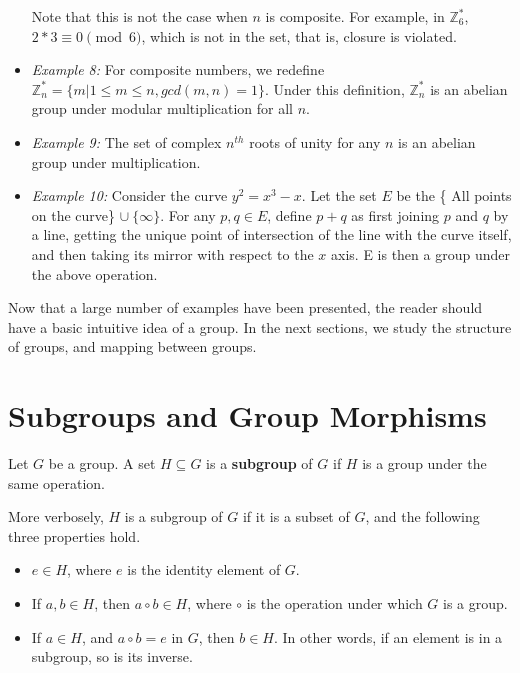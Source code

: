 \begin{itemize}
    Note that this is not the case when $n$ is composite. 
    For example, in $\mathbb{Z}_{6}^{*}$, $2 * 3 \equiv 0 \pmod{6}$, which is not in the set, that is, closure is violated.
  \item \emph{Example 8:} For composite numbers, we redefine $\mathbb{Z}_{n}^{*} = \{m | 1 \leq m \leq n, gcd(m, n)=1 \}$.
    Under this definition, $\mathbb{Z}_{n}^{*}$ is an abelian group under modular multiplication for all $n$.
  \item \emph{Example 9:} The set of complex $n^{th}$ roots of unity for any $n$ is an abelian group under multiplication.
  \item \emph{Example 10:} Consider the curve $y^2 = x^3 - x$.
    Let the set $E$ be the \{ All points on the curve\} $\cup \  \{ \infty \}$.
    For any $p, q \in E$, define $p+q$ as first joining $p$ and $q$ by a line, getting the unique point of intersection of the line with the curve itself, and then taking its mirror with respect to the $x$ axis.
    E is then a group under the above operation.
\end{itemize}
 
Now that a large number of examples have been presented, the reader should have a basic intuitive idea of a group.
In the next sections, we study the structure of groups, and mapping between groups.

\section{Subgroups and Group Morphisms}
\begin{definition} \label{def:subgroup}
  Let $G$ be a group.
  A set $H \subseteq G$ is a \textbf{subgroup} of $G$ if $H$ is a group under the same operation. 
\end{definition}
More verbosely, $H$ is a subgroup of $G$ if it is a subset of $G$, and the following three properties hold.
\begin{itemize}
  \item $e \in H$, where $e$ is the identity element of $G$.
  \item If $a, b \in H$, then $a \circ b \in H$, where $\circ$ is the operation under which $G$ is a group.
  \item If $a \in H$, and $a \circ b = e$ in $G$, then $b \in H$.
    In other words, if an element is in a subgroup, so is its inverse.
\end{itemize}

